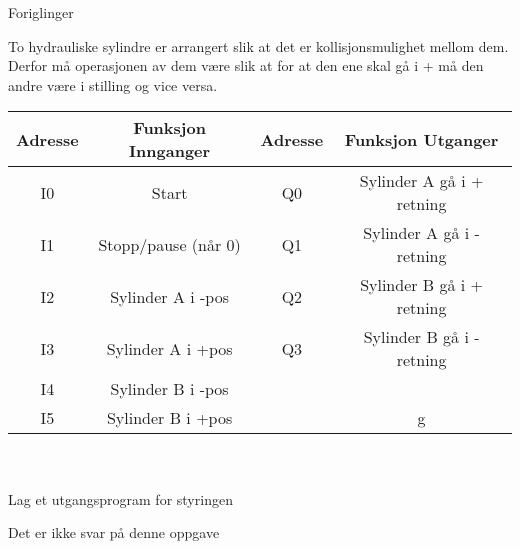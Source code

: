 


Foriglinger

To hydrauliske sylindre er arrangert slik at det er kollisjonsmulighet
mellom dem. Derfor må operasjonen av dem være slik at for at den ene
skal gå i + må den andre være i \textendash stilling og vice versa. 

\begin{tabular}{|c|c|c|c|}
\hline 
Adresse & Funksjon Innganger & Adresse & Funksjon Utganger\tabularnewline
\hline 
\hline 
I0 & Start & Q0 & Sylinder A gå i + retning\tabularnewline
\hline 
I1 & Stopp/pause (når 0) & Q1 & Sylinder A gå i - retning\tabularnewline
\hline 
I2 & Sylinder A i -pos & Q2 & Sylinder B gå i + retning\tabularnewline
\hline 
I3 & Sylinder A i +pos & Q3 & Sylinder B gå i - retning\tabularnewline
\hline 
I4 & Sylinder B i -pos &  & \tabularnewline
\hline 
I5 & Sylinder B i +pos &  & g\tabularnewline
\hline 
\end{tabular}
\\
\\
Lag et utgangsprogram for styringen






Det er ikke svar på denne oppgave













